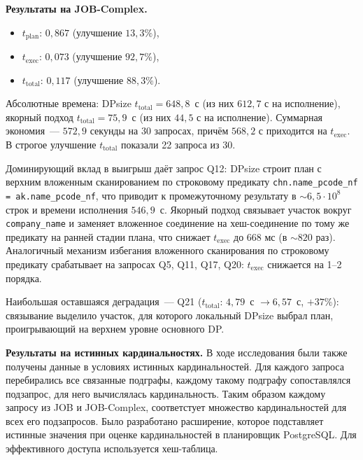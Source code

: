 \textbf{Результаты на JOB-Complex.}
\begin{itemize}
    \item $t_{\mathrm{plan}}$: $0{,}867$ (улучшение $13{,}3\%$),
    \item $t_{\mathrm{exec}}$: $0{,}073$ (улучшение $92{,}7\%$),
    \item $t_{\mathrm{total}}$: $0{,}117$ (улучшение $88{,}3\%$).
\end{itemize}
Абсолютные времена: DPsize $t_{\mathrm{total}} = 648{,}8$~с
(из них $612{,}7$ с на исполнение), якорный подход $t_{\mathrm{total}} = 75{,}9$~с
(из них $44{,}5$ с на исполнение).
Суммарная экономия~--- $572{,}9$ секунды на 30 запросах,
причём $568{,}2$ с приходится на $t_{\mathrm{exec}}$.
В строгое улучшение $t_{\mathrm{total}}$ показали 22 запроса из 30.
\par

Доминирующий вклад в выигрыш даёт запрос Q12:
DPsize строит план с верхним вложенным сканированием по строковому предикату
\texttt{chn.name\_pcode\_nf = ak.name\_pcode\_nf},
что приводит к промежуточному результату в $\sim\!6{,}5 \cdot 10^8$ строк
и времени исполнения $546{,}9$~с.
Якорный подход связывает участок вокруг \texttt{company\_name}
и заменяет вложенное соединение на хеш-соединение по тому же предикату на ранней
стадии плана, что снижает $t_{\mathrm{exec}}$ до $668$ мс (в $\sim\!820$ раз).
Аналогичный механизм избегания вложенного сканирования по
строковому предикату срабатывает на запросах Q5, Q11, Q17, Q20:
$t_{\mathrm{exec}}$ снижается на 1--2 порядка.
\par

Наибольшая оставшаяся деградация~--- Q21
($t_{\mathrm{total}}$: $4{,}79$~с $\to 6{,}57$~с, $+37\%$): связывание
выделило участок, для которого локальный DPsize выбрал план,
проигрывающий на верхнем уровне основного DP.
\par

\textbf{Результаты на истинных кардинальностях.}
В ходе исследования были также получены данные в условиях истинных кардинальностей. Для каждого запроса перебирались все связанные подграфы,
каждому такому подграфу сопоставлялся подзапрос,  для него вычислялась кардинальность. Таким образом каждому запросу из JOB и
JOB-Complex, соответстует множество кардинальностей для всех его подзапросов. Было разработано расширение, которое подставляет истинные
значения при оценке кардинальностей в планировщик PostgreSQL. Для эффективного доступа используется хеш-таблица.
\par

